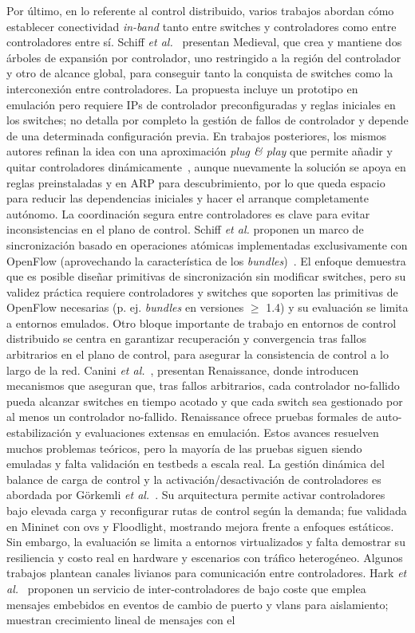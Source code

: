 Por último, en lo referente al control distribuido, varios trabajos abordan cómo establecer conectividad \textit{in-band} tanto entre switches y controladores como entre controladores entre sí. Schiff \textit{et al.}~\cite{Schiff15} presentan Medieval, que crea y mantiene dos árboles de expansión por controlador, uno restringido a la región del controlador y otro de alcance global, para conseguir tanto la conquista de switches como la interconexión entre controladores. La propuesta incluye un prototipo en emulación pero requiere IPs de controlador preconfiguradas y reglas iniciales en los switches; no detalla por completo la gestión de fallos de controlador y depende de una determinada configuración previa. En trabajos posteriores, los mismos autores refinan la idea con una aproximación \textit{plug \& play} que permite añadir y quitar controladores dinámicamente~\cite{Schiff16-2}, aunque nuevamente la solución se apoya en reglas preinstaladas y en ARP para descubrimiento, por lo que queda espacio para reducir las dependencias iniciales y hacer el arranque completamente autónomo. La coordinación segura entre controladores es clave para evitar inconsistencias en el plano de control. Schiff \textit{et al.} proponen un marco de sincronización basado en operaciones atómicas implementadas exclusivamente con OpenFlow (aprovechando la característica de los \textit{bundles})~\cite{Schiff16}. El enfoque demuestra que es posible diseñar primitivas de sincronización sin modificar switches, pero su validez práctica requiere controladores y switches que soporten las primitivas de OpenFlow necesarias (p. ej. \textit{bundles} en versiones $\geq$ 1.4) y su evaluación se limita a entornos emulados.  Otro bloque importante de trabajo en entornos de control distribuido se centra en garantizar recuperación y convergencia tras fallos arbitrarios en el plano de control, para asegurar la consistencia de control a lo largo de la red. Canini \textit{et al.}~\cite{Canini18,Canini22}, presentan Renaissance, donde introducen mecanismos que aseguran que, tras fallos arbitrarios, cada controlador no-fallido pueda alcanzar switches en tiempo acotado y que cada switch sea gestionado por al menos un controlador no-fallido. Renaissance ofrece pruebas formales de auto-estabilización y evaluaciones extensas en emulación. Estos avances resuelven muchos problemas teóricos, pero la mayoría de las pruebas siguen siendo emuladas y falta validación en testbeds a escala real. La gestión dinámica del balance de carga de control y la activación/desactivación de controladores es abordada por Görkemli \textit{et al.}~\cite{gorkemli2016dynamic}. Su arquitectura permite activar controladores bajo elevada carga y reconfigurar rutas de control según la demanda; fue validada en Mininet con \gls{ovs} y Floodlight, mostrando mejora frente a enfoques estáticos. Sin embargo, la evaluación se limita a entornos virtualizados y falta demostrar su resiliencia y costo real en hardware y escenarios con tráfico heterogéneo. Algunos trabajos plantean canales livianos para comunicación entre controladores. Hark \textit{et al.}~\cite{Hark17} proponen un servicio de inter-controladores de bajo coste que emplea mensajes embebidos en eventos de cambio de puerto y \glspl{vlan} para aislamiento; muestran crecimiento lineal de mensajes con el 